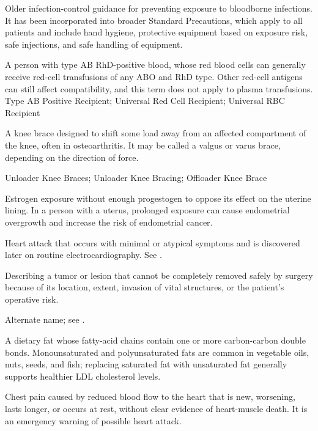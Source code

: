  Older infection-control guidance for preventing exposure to bloodborne infections. It has been incorporated into broader Standard Precautions, which apply to all patients and include hand hygiene, protective equipment based on exposure risk, safe injections, and safe handling of equipment.

 A person with type AB RhD-positive blood, whose red blood cells can generally receive red-cell transfusions of any ABO and RhD type. Other red-cell antigens can still affect compatibility, and this term does not apply to plasma transfusions.
\synonyms
Type AB Positive Recipient; Universal Red Cell Recipient; Universal RBC Recipient

 A knee brace designed to shift some load away from an affected compartment of the knee, often in osteoarthritis. It may be called a valgus or varus brace, depending on the direction of force.

\synonyms
Unloader Knee Braces; Unloader Knee Bracing; Offloader Knee Brace

 Estrogen exposure without enough progestogen to oppose its effect on the uterine lining. In a person with a uterus, prolonged exposure can cause endometrial overgrowth and increase the risk of endometrial cancer.

 Heart attack that occurs with minimal or atypical symptoms and is discovered later on routine electrocardiography. See .

 Describing a tumor or lesion that cannot be completely removed safely by surgery because of its location, extent, invasion of vital structures, or the patient’s operative risk.

 Alternate name; see .

 A dietary fat whose fatty-acid chains contain one or more carbon-carbon double bonds. Monounsaturated and polyunsaturated fats are common in vegetable oils, nuts, seeds, and fish; replacing saturated fat with unsaturated fat generally supports healthier LDL cholesterol levels.

 Chest pain caused by reduced blood flow to the heart that is new, worsening, lasts longer, or occurs at rest, without clear evidence of heart-muscle death. It is an emergency warning of possible heart attack.

